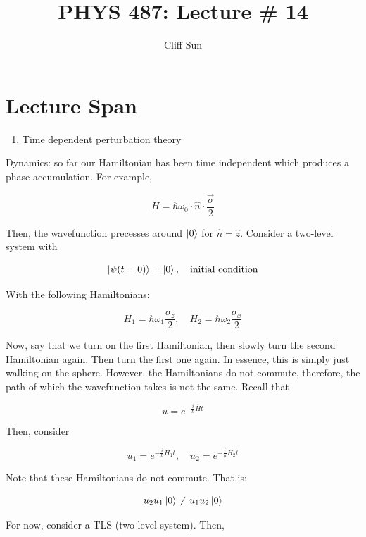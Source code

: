 \documentclass{article}
\title{PHYS 487: Lecture \# 14}
\author{Cliff Sun}
\newtheorem{one minute paper}[theorem]{One Minute Paper}
\begin{document}
\maketitle

\section*{Lecture Span}
\begin{enumerate}
    \item Time dependent perturbation theory
\end{enumerate}

Dynamics: so far our Hamiltonian has been time independent which produces a phase accumulation. For example, 

\begin{equation}
    H = \hbar \omega_0 \cdot \hat{n} \cdot \frac{\vec{\sigma}}{2}
\end{equation}

Then, the wavefunction precesses around $\ket{0}$ for $\hat{n} = \hat{z}$. Consider a two-level system with 

$$
\ket{\psi(t=0)} = \ket{0}, \quad \text{initial condition}
$$

With the following Hamiltonians: 

$$H_1 = \hbar \omega_1 \frac{\sigma_z}{2}, \quad H_2 = \hbar \omega_2 \frac{\sigma_x}{2}$$ 

Now, say that we turn on the first Hamiltonian, then slowly turn the second Hamiltonian again. Then turn the first one again. In essence, this 
is simply just walking on the sphere. However, the Hamiltonians do not commute, therefore, the path of which the wavefunction takes is not the same. Recall that 

\begin{equation}
    u = e^{-\frac{i}{\hbar}\hat{H}t}
\end{equation}

Then, consider 

\begin{equation}
    u_1 = e^{-\frac{i}{\hbar}H_1 t}, \quad u_2 = e^{-\frac{i}{\hbar}H_2 t}
\end{equation}

Note that these Hamiltonians do not commute. That is:

\begin{equation}
    u_2u_1 \ket{0} \neq u_1u_2\ket{0}
\end{equation}

For now, consider a TLS (two-level system). Then, 
\end{document}
